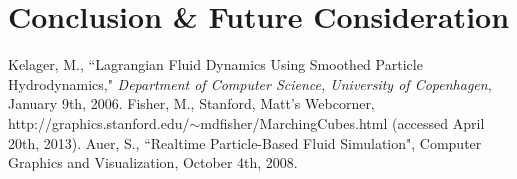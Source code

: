 \documentclass[11pt]{article}
\begin{document}
\section*{Conclusion \& Future Consideration}

\begin{thebibliography}{5} 
 Kelager, M., ``Lagrangian Fluid Dynamics Using Smoothed Particle Hydrodynamics," \emph{Department of Computer Science, University of Copenhagen}, January 9th, 2006.
 Fisher, M., Stanford, Matt's Webcorner, 
\\ http://graphics.stanford.edu/$\sim$mdfisher/MarchingCubes.html (accessed April 20th, 2013).
 Auer, S., ``Realtime Particle-Based Fluid Simulation", Computer Graphics and Visualization, October 4th, 2008.
\end{thebibliography}
\end{document}
